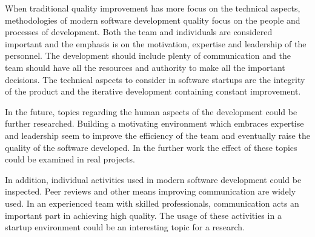 When traditional quality improvement has more focus on the technical aspects, methodologies of modern software development quality focus on the people and processes of development. Both the team and individuals are considered important and the emphasis is on the motivation, expertise and leadership of the personnel. The development should include plenty of communication and the team should have all the resources and authority to make all the important decisions. The technical aspects to consider in software startups are the integrity of the product and the iterative development containing constant improvement.


In the future, topics regarding the human aspects of the development could be further researched. Building a motivating environment which embraces expertise and leadership seem to improve the efficiency of the team and eventually raise the quality of the software developed. In the further work the effect of these topics could be examined in real projects.

In addition, individual activities used in modern software development could be inspected. Peer reviews and other means improving communication are widely used. In an experienced team with skilled professionals, communication acts an important part in achieving high quality. The usage of these activities in a startup environment could be an interesting topic for a research.
